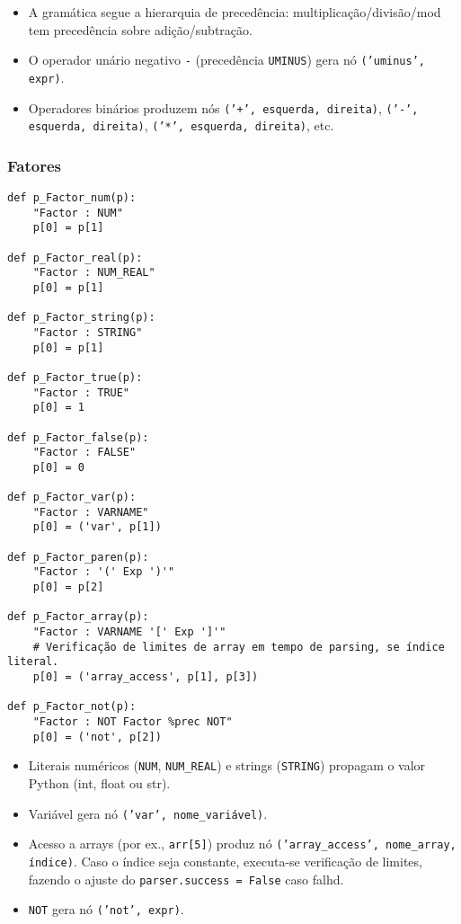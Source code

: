 \noindent

\begin{itemize}
    \item A gramática segue a hierarquia de precedência: multiplicação/divisão/mod tem precedência sobre adição/subtração. 
    \item O operador unário negativo \texttt{-} (precedência \texttt{UMINUS}) gera nó \texttt{('uminus', expr)}.
    \item Operadores binários produzem nós \texttt{('+', esquerda, direita)}, \texttt{('-', esquerda, direita)}, \texttt{('*', esquerda, direita)}, etc.
\end{itemize}

\subsubsection{Fatores}

\begin{verbatim}
def p_Factor_num(p):
    "Factor : NUM"
    p[0] = p[1]

def p_Factor_real(p):
    "Factor : NUM_REAL"
    p[0] = p[1]

def p_Factor_string(p):
    "Factor : STRING"
    p[0] = p[1]

def p_Factor_true(p):
    "Factor : TRUE"
    p[0] = 1

def p_Factor_false(p):
    "Factor : FALSE"
    p[0] = 0

def p_Factor_var(p):
    "Factor : VARNAME"
    p[0] = ('var', p[1])

def p_Factor_paren(p):
    "Factor : '(' Exp ')'"
    p[0] = p[2]

def p_Factor_array(p):
    "Factor : VARNAME '[' Exp ']'"
    # Verificação de limites de array em tempo de parsing, se índice literal.
    p[0] = ('array_access', p[1], p[3])

def p_Factor_not(p):
    "Factor : NOT Factor %prec NOT"
    p[0] = ('not', p[2])
\end{verbatim}

\noindent

\begin{itemize}
    \item Literais numéricos (\texttt{NUM}, \texttt{NUM\_REAL}) e strings (\texttt{STRING}) propagam o valor Python (int, float ou str).
    \item Variável gera nó \texttt{('var', nome\_variável)}.
    \item Acesso a arrays (por ex., \texttt{arr[5]}) produz nó \texttt{('array\_access', nome\_array, índice)}. Caso o índice seja constante, executa-se verificação de limites, fazendo o ajuste do \texttt{parser.success = False} caso falhd.
    \item \texttt{NOT} gera nó \texttt{('not', expr)}.
\end{itemize}

